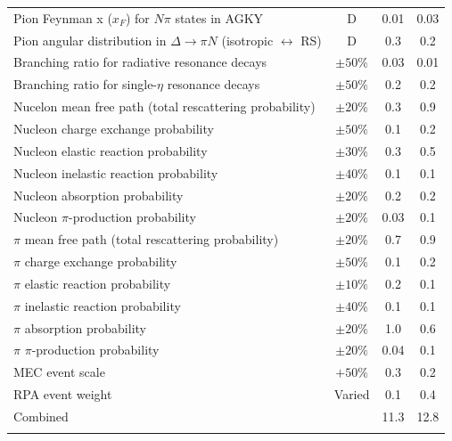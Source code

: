 \begin{longtable}{p{3in} c @{\hskip 0.25in} c c}
  Pion Feynman x ($x_F$) for $N\pi$ states in AGKY & D & 0.01 & 0.03 \\
  Pion angular distribution in $\Delta \rightarrow \pi N$ \newline (isotropic $\leftrightarrow$ RS) & D & 0.3 & 0.2 \\
  Branching ratio for radiative resonance decays & $\pm50\%$ & 0.03 & 0.01 \\
  Branching ratio for single-$\eta$ resonance decays & $\pm50\%$ & 0.2 & 0.2 \\
  Nucelon mean free path (total rescattering \newline probability) & $\pm20\%$ & 0.3 & 0.9 \\
  Nucleon charge exchange probability & $\pm50\%$ & 0.1 & 0.2 \\
  Nucleon elastic reaction probability & $\pm30\%$ & 0.3 & 0.5 \\
  Nucleon inelastic reaction probability & $\pm40\%$ & 0.1 & 0.1 \\
  Nucleon absorption probability & $\pm20\%$ & 0.2 & 0.2 \\
  Nucleon $\pi$-production probability & $\pm20\%$ & 0.03 & 0.1 \\
  $\pi$ mean free path (total rescattering probability) & $\pm20\%$ & 0.7 & 0.9 \\
  $\pi$ charge exchange probability & $\pm50\%$ & 0.1 & 0.2 \\
  $\pi$ elastic reaction probability & $\pm10\%$ & 0.2 & 0.1 \\
  $\pi$ inelastic reaction probability & $\pm40\%$ & 0.1 & 0.1 \\
  $\pi$ absorption probability & $\pm20\%$ & 1.0 & 0.6 \\
  $\pi$ $\pi$-production probability & $\pm20\%$ & 0.04 & 0.1 \\
  MEC event scale & $+50\%$ & 0.3 & 0.2 \\
  RPA event weight & Varied & 0.1 & 0.4 \\
  \hline
  Combined & & 11.3 & 12.8 \\
  \hline
  \label{tab:SystGENIE}
\end{longtable}
\doublespacing


